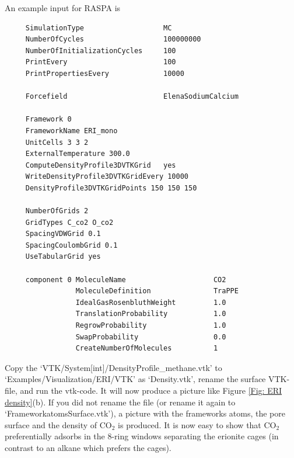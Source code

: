 An example input for RASPA is
\begin{verbatim}
     SimulationType                   MC
     NumberOfCycles                   100000000
     NumberOfInitializationCycles     100
     PrintEvery                       100
     PrintPropertiesEvery             10000

     Forcefield                       ElenaSodiumCalcium

     Framework 0
     FrameworkName ERI_mono
     UnitCells 3 3 2
     ExternalTemperature 300.0
     ComputeDensityProfile3DVTKGrid   yes
     WriteDensityProfile3DVTKGridEvery 10000
     DensityProfile3DVTKGridPoints 150 150 150

     NumberOfGrids 2
     GridTypes C_co2 O_co2
     SpacingVDWGrid 0.1
     SpacingCoulombGrid 0.1
     UseTabularGrid yes

     component 0 MoleculeName                     CO2
                 MoleculeDefinition               TraPPE
                 IdealGasRosenbluthWeight         1.0
                 TranslationProbability           1.0
                 RegrowProbability                1.0
                 SwapProbability                  0.0
                 CreateNumberOfMolecules          1
\end{verbatim}

Copy the `VTK/System[int]/DensityProfile\_methane.vtk' to `Examples/Visualization/ERI/VTK' as `Density.vtk',
rename the surface VTK-file,
and run the vtk-code. It will now produce a picture like Figure \ref{Fig: ERI density}(b).
If you did not rename the file (or rename it again to `FrameworkatomsSurface.vtk'), a picture with the frameworks atoms,
the pore surface and the density of CO$_2$ is produced. It is now easy to show that CO$_2$ preferentially adsorbs
in the 8-ring windows separating the erionite cages (in contrast to an alkane which prefers the cages).

